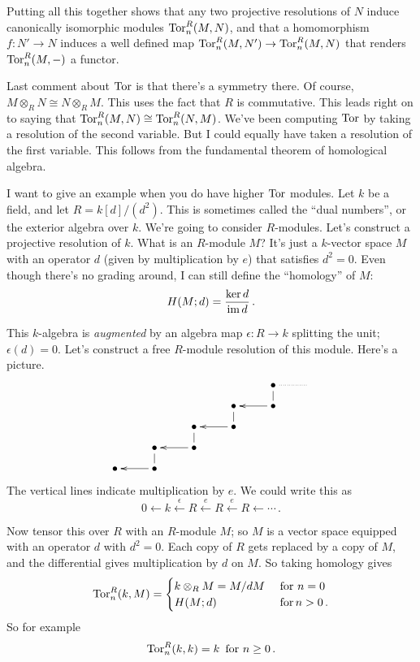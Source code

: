 Putting all this together shows that any two projective resolutions of $N$ 
induce canonically isomorphic modules $\operatorname{Tor}_n^R(M,N)$, and that a homomorphism
$f:N'\to N$ induces a well defined map $\operatorname{Tor}_n^R(M,N')\to\operatorname{Tor}_n^R(M,N)$
that renders $\operatorname{Tor}^R_n(M,-)$ a functor. 

Last comment about $\operatorname{Tor}$ is that there's a symmetry there. Of course, $M\otimes_R N\cong N\otimes_R M$. This uses the fact that $R$ is commutative. This leads right on to saying that $\operatorname{Tor}^R_n(M,N)\cong \operatorname{Tor}^R_n(N,M)$. We've been computing $\operatorname{Tor}$ by taking a resolution of the second variable. But I could equally have taken a resolution of the first variable. This follows from the fundamental theorem of homological algebra.


\begin{example}
I want to give an example when you do have higher $\operatorname{Tor}$ modules. Let $k$ be a field, and let $R=k[d]/(d^2)$. This is sometimes called the ``dual numbers'', or the exterior algebra over $k$. We're going to consider $R$-modules. Let's construct a projective resolution of $k$. What is an $R$-module $M$? It's just a $k$-vector space $M$ with an operator $d$ (given by multiplication by $e$) that satisfies $d^2=0$. Even though there's no grading around, I can still define the ``homology'' of $M$:
\[
H(M;d)=\frac{\ker d}{\operatorname{im} d}\,.
\]

This $k$-algebra is {\em augmented} by an algebra map $\epsilon:R\to k$ splitting the unit; $\epsilon(d)=0$. Let's construct a free $R$-module resolution of this module. Here's a picture.
\[
\xymatrix@R=8pt{
&&&& \bullet \ar@{..}[r] \ar@{-}[d] & \\
&&& \bullet \ar@{-}[d] & \bullet \ar[l]  \\
&& \bullet \ar@{-}[d] & \bullet \ar[l] \\
& \bullet \ar@{-}[d] & \bullet \ar[l] \\
\bullet & \bullet \ar[l]
}\]
The vertical lines indicate multiplication by $e$. We could write this as
\[
0\leftarrow 
k\xleftarrow{\epsilon}R\xleftarrow{e}R\xleftarrow{e}R\leftarrow\cdots\,.
\]

Now tensor this over $R$ with an $R$-module $M$; so $M$ is a vector space 
equipped with an operator $d$ with $d^2=0$. Each copy of $R$ gets replaced by
a copy of $M$, and the differential gives multiplication by $d$ on $M$. So 
taking homology gives 
\[
\operatorname{Tor}^R_n(k,M)=
\begin{cases}k\otimes_RM=M/dM\,&\,\hbox{for}\,\,n=0\\
H(M;d)\,&\,\hbox{for}\,n>0\,.
\end{cases}
\]
So for example 
\[
\operatorname{Tor}^R_n(k,k)=k\,\,\,\hbox{for}\,\,n\geq0\,.
\]
\end{example}

